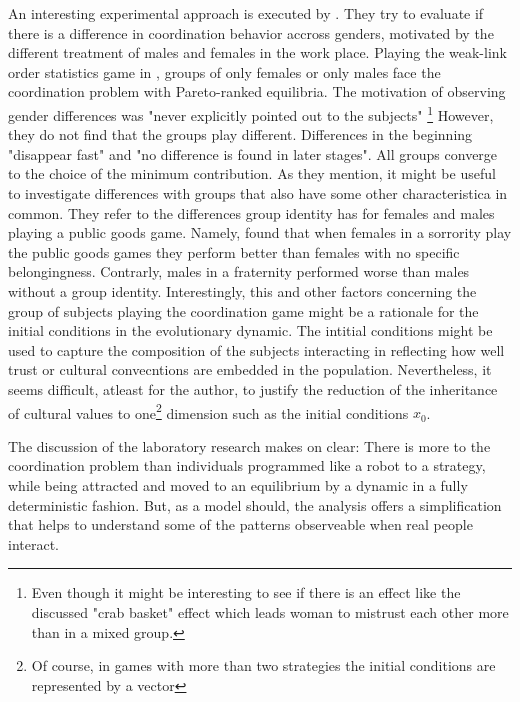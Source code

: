 \documentclass[11pt]{article}
\begin{document}
An interesting experimental approach is executed by 
\textcite{dufwenberg_gender_2005}. They try to evaluate if there is a difference
in coordination behavior accross genders, motivated by the different
treatment of males and females in the work place. Playing the weak-link order
statistics game in \cite{van_huyck_tacit_1990}, groups of only females or only
males face the coordination problem with Pareto-ranked equilibria. The 
motivation of observing gender differences was "never explicitly pointed 
out to the subjects" \parencite{dufwenberg_gender_2005}\footnote{
Even though it might be interesting to see if there is an effect like 
the discussed "crab basket" effect which leads woman to mistrust each other 
more than in a mixed group.} However, they do not find that the groups play
different. Differences in the beginning "disappear fast" and "no difference
is found in later stages". All groups converge to the choice of the minimum
contribution. As they mention, it might be useful to investigate differences
with groups that also have some other characteristica in common. They refer
to the differences group identity has for females and males playing a 
public goods game. Namely, \textcite{croson_groups_2008} found that when
females in a sorrority play the public goods games they perform better than 
females with no specific belongingness. Contrarly, males in a fraternity 
performed worse than males without a group identity. 
Interestingly, this and other factors concerning the group of subjects 
playing the coordination game might be a rationale for the initial conditions
in the evolutionary dynamic. The intitial conditions might be used to 
capture the composition of the subjects interacting in reflecting how well
trust or cultural convecntions are embedded in the population. 
Nevertheless, it seems difficult, atleast for the author, to justify
the reduction of the inheritance of cultural values to one\footnote{Of course, in games with more 
than two strategies the initial conditions are represented by a vector}
dimension such as the initial conditions $x_0$.

The discussion of the laboratory research makes on clear: There is more
to the coordination problem than individuals programmed like a robot 
to a strategy, while being attracted and moved to an equilibrium by a dynamic
in a fully deterministic fashion. But, as a model should, the analysis offers 
a simplification that helps to understand some of the patterns observeable 
when real people interact.
\end{document}
